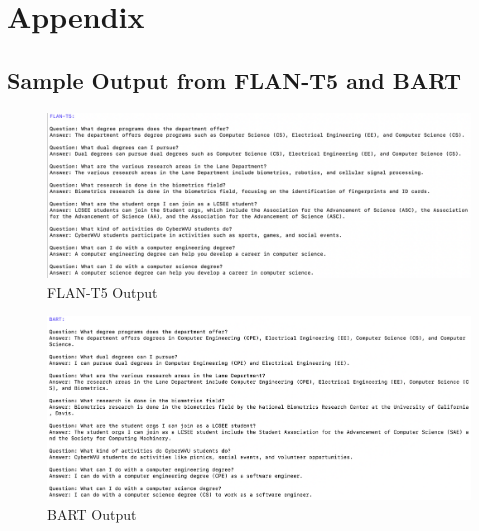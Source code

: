 \documentclass[conference]{IEEEtran}
\begin{document}
\newpage
\onecolumn
\appendix
\section{Appendix}
\subsection{Sample Output from FLAN-T5 and BART} \label{sample-output}
\begin{figure}[h]
    \centering
    \includegraphics[width=\linewidth]{assets/Flan_out.png}
    \caption{FLAN-T5 Output}
    \label{fig:FLAN_Out}
\end{figure}

\begin{figure}[h]
    \centering
    \includegraphics[width=\linewidth]{assets/Bart_out.png}
    \caption{BART Output}
    \label{fig:BART_Out}
\end{figure}
\end{document}
